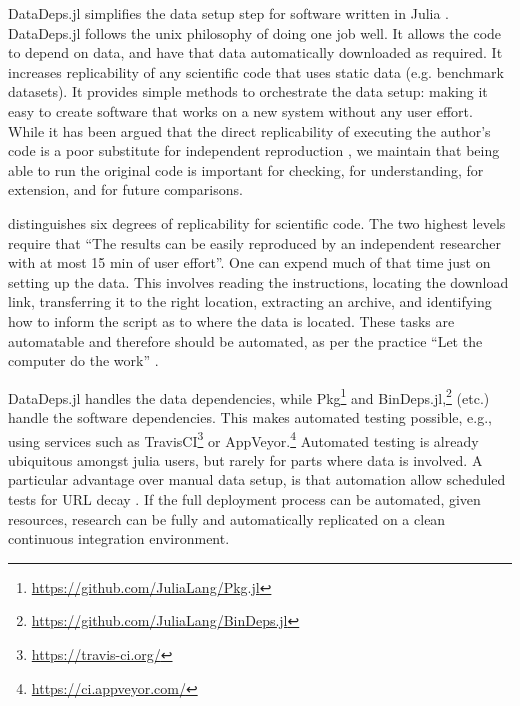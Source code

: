 \documentclass[dvinames]{josr}
\begin{document}
DataDeps.jl simplifies the data setup step for software written in Julia \citep{Julia}.
DataDeps.jl follows the unix philosophy of doing one job well.
It allows the code to depend on data, and have that data automatically downloaded as required.
It increases replicability of any scientific code that uses static data (e.g. benchmark datasets).
It provides simple methods to orchestrate the data setup: making it easy to create software that works on a new system without any user effort.
While it has been argued that the direct replicability of executing the author's code is a poor substitute for independent reproduction \citep{drummond2009replicability},
we maintain that being able to run the original code is important for checking, for understanding, for extension, and for future comparisons.


\citet{VabdewakkeReproduceableResearch} distinguishes six degrees of replicability for scientific code.
The two highest levels
require that ``The results can be easily reproduced by an independent researcher with at most 15 min of user effort''.
One can  expend much of that time just on setting up the data.
This involves reading the instructions, locating the download link, transferring it to the right location, extracting an archive, and identifying how to inform the script as to where the data is located.
These tasks are automatable and therefore should be automated, as per the practice  ``Let the computer do the work'' \citep{10.1371/journal.pbio.1001745}.


DataDeps.jl handles the data dependencies, while Pkg\footnote{\url{https://github.com/JuliaLang/Pkg.jl}} 
and BinDeps.jl,\footnote{\url{https://github.com/JuliaLang/BinDeps.jl}}
 (etc.) handle the software dependencies.
This makes automated testing possible, e.g., using services such as 
TravisCI\footnote{\url{https://travis-ci.org/}} or AppVeyor.\footnote{\url{https://ci.appveyor.com/}}
Automated testing is already ubiquitous amongst julia users, but rarely for parts where data is involved.
A particular advantage over manual data setup, is that automation allow scheduled tests for URL decay \citep{wren2008url}.
If the full deployment process can be automated, given resources, research can be fully and automatically replicated on a clean continuous integration environment.
\end{document}
